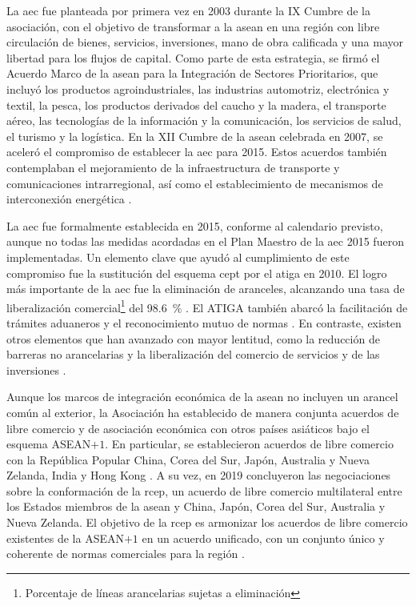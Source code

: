La \acrfull{aec} fue planteada por primera vez en 2003 durante la IX Cumbre de la asociación, con el objetivo de transformar a la \gls{asean} en una región con libre circulación de bienes, servicios, inversiones, mano de obra calificada y una mayor libertad para los flujos de capital. Como parte de esta estrategia, se firmó el Acuerdo Marco de la \gls{asean} para la Integración de Sectores Prioritarios, que incluyó los productos agroindustriales, las industrias automotriz, electrónica y textil, la pesca, los productos derivados del caucho y la madera, el transporte aéreo, las tecnologías de la información y la comunicación, los servicios de salud, el turismo y la logística. En la XII Cumbre de la \gls{asean} celebrada en 2007, se aceleró el compromiso de establecer la \gls{aec} para 2015. Estos acuerdos también contemplaban el mejoramiento de la infraestructura de transporte y comunicaciones intrarregional, así como el establecimiento de mecanismos de interconexión energética \parencite{Ishikawa2021, ASEAN_Vision_2020}.

La \gls{aec} fue formalmente establecida en 2015, conforme al calendario previsto, aunque no todas las medidas acordadas en el Plan Maestro de la \gls{aec} 2015 fueron implementadas. Un elemento clave que ayudó al cumplimiento de este compromiso fue la sustitución del esquema \gls{cept} por el \gls{atiga} en 2010. El logro más importante de la \gls{aec} fue la eliminación de aranceles, alcanzando una tasa de liberalización comercial\footnote{Porcentaje de líneas arancelarias sujetas a eliminación} del 98.6~\% \parencite[p.~29]{Ishikawa2021}. El ATIGA también abarcó la facilitación de trámites aduaneros y el reconocimiento mutuo de normas \parencite[p.~16]{ASEAN_AIR2012}. En contraste, existen otros elementos que han avanzado con mayor lentitud, como la reducción de barreras no arancelarias y la liberalización del comercio de servicios y de las inversiones \parencite[p.~29]{Ishikawa2021}.

Aunque los marcos de integración económica de la \gls{asean} no incluyen un arancel común al exterior, la Asociación ha establecido de manera conjunta acuerdos de libre comercio y de asociación económica con otros países asiáticos bajo el esquema ASEAN$+1$. En particular, se establecieron acuerdos de libre comercio con la República Popular China, Corea del Sur, Japón, Australia y Nueva Zelanda, India y Hong Kong \parencite{ASEAN_FTA}. A su vez, en 2019 concluyeron las negociaciones sobre la conformación de la \gls{rcep}, un acuerdo de libre comercio multilateral entre los Estados miembros de la \gls{asean} y China, Japón, Corea del Sur, Australia y Nueva Zelanda. El objetivo de la \gls{rcep} es armonizar los acuerdos de libre comercio existentes de la ASEAN$+1$ en un acuerdo unificado, con un conjunto único y coherente de normas comerciales para la región \parencite[pp.~92--94]{ASEAN_Digital2025}.

